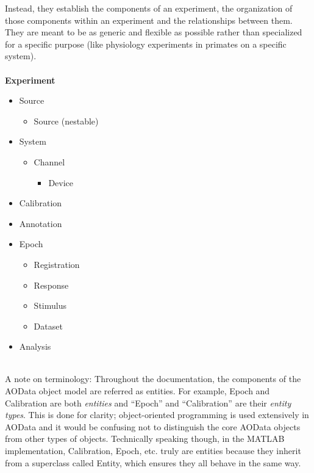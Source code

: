 \documentclass[10pt]{exam}
\begin{document}
	Instead, they establish the components of an experiment, the organization of those components within an experiment and the relationships between them. They are meant to be as generic and flexible as possible rather than specialized for a specific purpose (like physiology experiments in primates on a specific system). 
	\\$\quad$\\
	\textbf{Experiment}
	\begin{itemize}
		\item Source
		\begin{itemize}
			\item Source (nestable)
		\end{itemize}
		\item System
		\begin{itemize}
			\item Channel
			\begin{itemize}
				\item Device
			\end{itemize}
		\end{itemize}
		\item Calibration
		\item Annotation
		\item Epoch
		\begin{itemize}
			\item Registration
			\item Response
			\item Stimulus
			\item Dataset
		\end{itemize}
		\item Analysis
	\end{itemize}
	$\quad$\\
    A note on terminology: Throughout the documentation, the components of the AOData object model are referred  as entities. For example, Epoch and Calibration are both \textit{entities} and ``Epoch'' and ``Calibration'' are their \textit{entity types}. This is done for clarity; object-oriented programming is used extensively in AOData and it would be confusing not to distinguish the core AOData objects from other types of objects. Technically speaking though, in the MATLAB implementation, Calibration, Epoch, etc. truly are entities because they inherit from a superclass called Entity, which ensures they all behave in the same way. 
\end{document}
